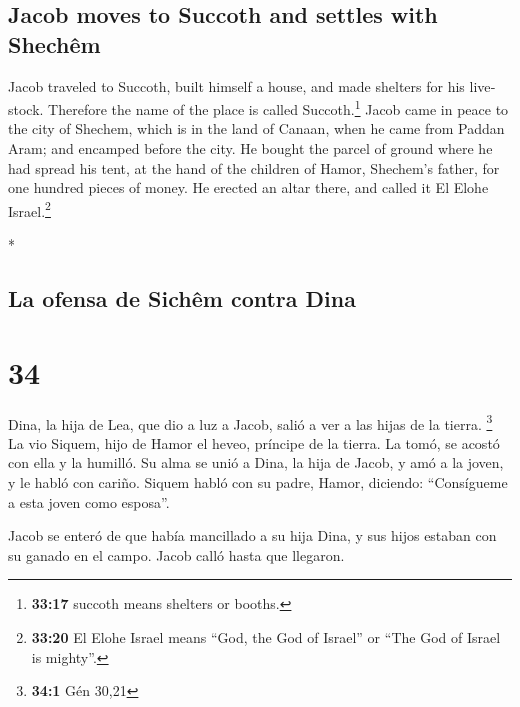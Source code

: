 \begin{paracol}{2}
\begin{otherlanguage}{english}
\hypertarget{jacob-moves-to-succoth-and-settles-with-shechuxeam}{%
\subsection{Jacob moves to Succoth and settles with
Shechêm}\label{jacob-moves-to-succoth-and-settles-with-shechuxeam}}

 Jacob traveled to Succoth, built himself a house, and
made shelters for his livestock. Therefore the name of the place is
called Succoth.\footnote{\textbf{33:17} succoth means shelters or
  booths.}  Jacob came in peace to the city of Shechem,
which is in the land of Canaan, when he came from Paddan Aram; and
encamped before the city.  He bought the parcel of ground
where he had spread his tent, at the hand of the children of Hamor,
Shechem's father, for one hundred pieces of money.  He
erected an altar there, and called it El Elohe Israel.\footnote{\textbf{33:20}
  El Elohe Israel means ``God, the God of Israel'' or ``The God of
  Israel is mighty''.}

\end{otherlanguage}

\switchcolumn[0]*

\hypertarget{la-ofensa-de-sichuxeam-contra-dina}{%
\subsection{La ofensa de Sichêm contra
Dina}\label{la-ofensa-de-sichuxeam-contra-dina}}

\hypertarget{section-66}{%
\section{34}\label{section-66}}

 Dina, la hija de Lea, que dio a luz a Jacob, salió a ver
a las hijas de la tierra. \footnote{\textbf{34:1} Gén 30,21}
 La vio Siquem, hijo de Hamor el heveo, príncipe de la
tierra. La tomó, se acostó con ella y la humilló.  Su alma
se unió a Dina, la hija de Jacob, y amó a la joven, y le habló con
cariño.  Siquem habló con su padre, Hamor, diciendo:
``Consígueme a esta joven como esposa''.

 Jacob se enteró de que había mancillado a su hija Dina, y
sus hijos estaban con su ganado en el campo. Jacob calló hasta que
llegaron.

\hypertarget{hemor-corteja-a-dina-de-los-hijos-de-jacob}{%
}
\end{paracol}
